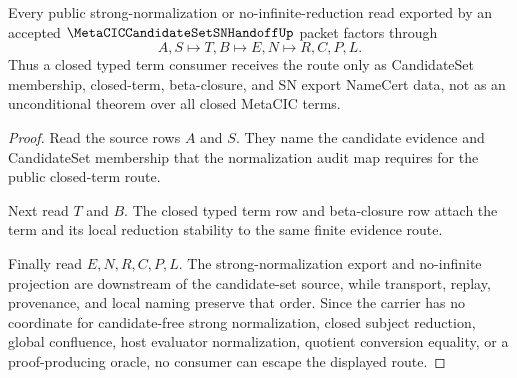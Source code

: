 \begin{theorem}
\label{thm:metacic-candidate-set-sn-export-nonescape}
Every public strong-normalization or no-infinite-reduction read exported by an accepted $\MetaCICCandidateSetSNHandoffUp$ packet factors through
$$
A,S\longmapsto T,B\longmapsto E,N\longmapsto R,C,P,L .
$$
Thus a closed typed term consumer receives the route only as CandidateSet membership, closed-term, beta-closure, and SN export NameCert data, not as an unconditional theorem over all closed MetaCIC terms.
\end{theorem}
\begin{proof}
Read the source rows $A$ and $S$. They name the candidate evidence and CandidateSet membership that the normalization audit map requires for the public closed-term route.

Next read $T$ and $B$. The closed typed term row and beta-closure row attach the term and its local reduction stability to the same finite evidence route.

Finally read $E,N,R,C,P,L$. The strong-normalization export and no-infinite projection are downstream of the candidate-set source, while transport, replay, provenance, and local naming preserve that order. Since the carrier has no coordinate for candidate-free strong normalization, closed subject reduction, global confluence, host evaluator normalization, quotient conversion equality, or a proof-producing oracle, no consumer can escape the displayed route.
\end{proof}

